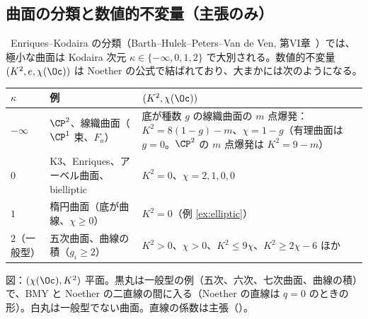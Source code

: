 \subsection{曲面の分類と数値的不変量（主張のみ）}
\tC\ Enriques--Kodaira の分類（Barth--Hulek--Peters--Van de Ven, 第VI章\tQ\ ）では、極小な曲面は Kodaira 次元 $\kappa\in\{-\infty,0,1,2\}$ で大別される。数値的不変量 $(K^2,e,\chi(\Oc))$ は Noether の公式で結ばれており、大まかには次のようになる。
\begin{center}
{\small\begin{tabular}{l|p{5.6cm}|p{5.6cm}}
\toprule
$\kappa$ & 例 & $(K^2,\chi(\Oc))$\\
\midrule
$-\infty$ & $\CP^2$、線織曲面（$\CP^1$ 束、$F_a$） & 底が種数 $g$ の線織曲面の $m$ 点爆発：$K^2=8(1-g)-m$、$\chi=1-g$（有理曲面は $g=0$。$\CP^2$ の $m$ 点爆発は $K^2=9-m$）\\
$0$ & K3、Enriques、アーベル曲面、bielliptic & $K^2=0$、$\chi=2,1,0,0$\\
$1$ & 楕円曲面（底が曲線、$\chi\ge0$） & $K^2=0$（例 \ref{ex:elliptic}）\\
$2$（一般型） & 五次曲面、曲線の積（$g_i\ge2$） & $K^2>0$、$\chi>0$、$K^2\le9\chi$、$K^2\ge2\chi-6$ ほか\\
\bottomrule
\end{tabular}}
\end{center}

\begin{center}
\end{center}
{\small 図：$(\chi(\Oc),K^2)$ 平面。黒丸は一般型の例（五次、六次、七次曲面、曲線の積）で、BMY と Noether の二直線の間に入る（Noether の直線は $q=0$ のときの形）。白丸は一般型でない曲面。直線の係数は主張（\tC）。}

